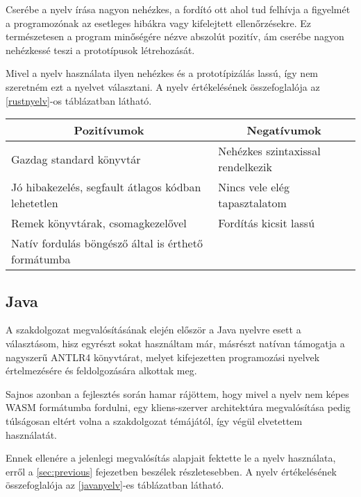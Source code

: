 Cserébe a nyelv írása nagyon nehézkes, a fordító ott ahol tud felhívja a figyelmét a programozónak az esetleges hibákra vagy kifelejtett ellenőrzésekre. Ez természetesen a program minőségére nézve abszolút pozitív, ám cserébe nagyon nehézkessé teszi a prototípusok létrehozását.

Mivel a nyelv használata ilyen nehézkes és a prototípizálás lassú, így nem szeretném ezt a nyelvet választani. A nyelv értékelésének összefoglalója az \ref{rustnyelv}-os táblázatban látható.

\begin{center}
  \begin{tabularx}{\textwidth}{X X}
    \hline
    \multicolumn{1}{c}{\bfseries{Pozitívumok}}         & \multicolumn{1}{c}{\bfseries{Negatívumok}} \\
    \hline
    Gazdag standard könyvtár                           & Nehézkes szintaxissal rendelkezik          \\
    Jó hibakezelés, segfault átlagos kódban lehetetlen & Nincs vele elég tapasztalatom              \\
    Remek könyvtárak, csomagkezelővel                  & Fordítás kicsit lassú                      \\
    Natív fordulás böngésző által is érthető formátumba                                             \\
    \hline
  \end{tabularx}
\end{center}

\newpage

\subsection{Java}
\label{sec:java}

A szakdolgozat megvalósításának elején először a Java nyelvre esett a választásom, hisz egyrészt sokat használtam már, másrészt natívan támogatja a nagyszerű ANTLR4 könyvtárat, melyet kifejezetten programozási nyelvek értelmezésére és feldolgozására alkottak meg.

Sajnos azonban a fejlesztés során hamar rájöttem, hogy mivel a nyelv nem képes WASM formátumba fordulni, egy kliens-szerver architektúra megvalósítása pedig túlságosan eltért volna a szakdolgozat témájától, így végül elvetettem használatát.

Ennek ellenére a jelenlegi megvalósítás alapjait fektette le a nyelv használata, erről a \ref{sec:previous} fejezetben beszélek részletesebben. A nyelv értékelésének összefoglalója az \ref{javanyelv}-es táblázatban látható.

